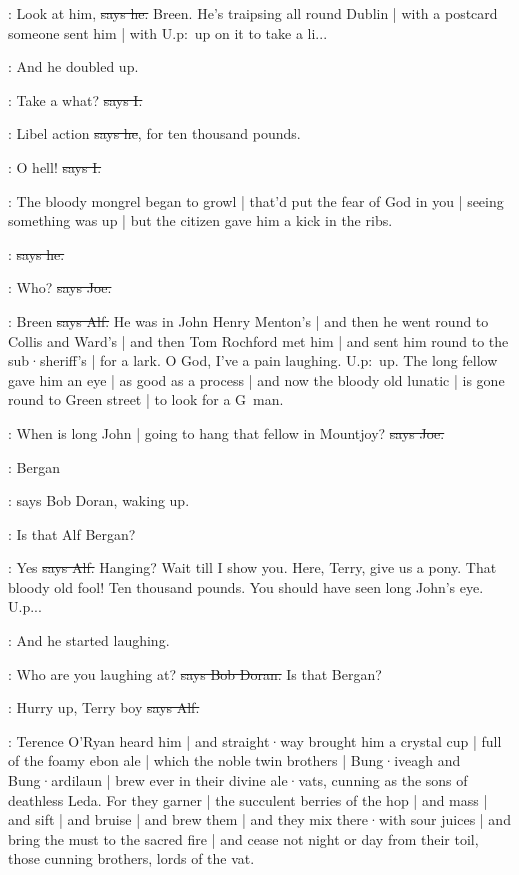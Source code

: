 \bergan:
Look at him,
\sout{says he.}
Breen.
He's traipsing all round Dublin |
with a postcard someone sent him |
with U.p:~up
on it to take a li...

\Nq:
And he doubled up.

:
Take a what?
\sout{says I.}

\bergan:
Libel action
\sout{says he},
for ten thousand pounds.

:
O hell!
\sout{says I.}

\Nq:
The bloody mongrel began to growl |
that'd put the fear of God in you |
seeing something was up |
but the citizen gave him a kick in the ribs.

\citizen:
\sout{says he.}

\joe:
Who?
\sout{says Joe.}

\bergan:
Breen
\sout{says Alf.}
He was in John Henry Menton's |
and then he went round to Collis and Ward's |
and then Tom Rochford met him |
and sent him round to the sub·sheriff's |
for a lark.
O God,
I've a pain laughing.
U.p:~up.
The long fellow gave him an eye |
as good as a process
 |
and now the bloody old lunatic |
is gone round to Green street |
to look for a G~man.

\joe:
When is long John |
going to hang that fellow in Mountjoy?
\sout{says Joe.}

\doran:
Bergan

\Nq:
says Bob Doran,
waking up.

\doran:
Is that Alf Bergan?

\bergan:
Yes
\sout{says Alf.}
Hanging?
Wait till I show you.
Here,
Terry,
give us a pony.
That bloody old fool!
Ten thousand pounds.
You should have seen long John's eye.
U.p...

\Nq:
And he started laughing.

\doran:
Who are you laughing at?
\sout{says Bob Doran.}
Is that Bergan?

\bergan:
Hurry up,
Terry boy
\sout{says Alf.}

:
Terence O'Ryan heard him
 |
and straight·way brought him a crystal cup |
full of the foamy ebon ale |
which the noble twin brothers |
Bung·iveagh and Bung·ardilaun |
brew ever in their divine ale·vats,
cunning as the sons of deathless Leda.
For they garner |
the succulent berries of the hop |
and mass |
and sift |
and bruise |
and brew them |
and they mix there·with sour juices |
and bring the must to the sacred fire |
and cease not night or day from their toil,
those cunning brothers,
lords of the vat.

